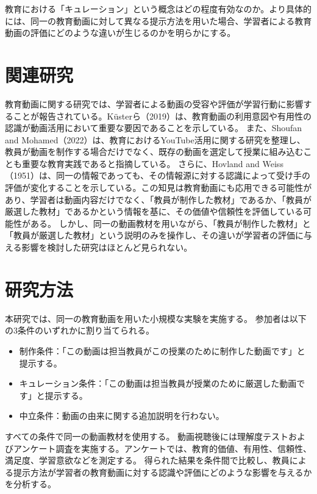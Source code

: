 \documentclass[a4paper,10pt]{ltjsarticle}
\begin{document}
教育における「キュレーション」という概念はどの程度有効なのか。より具体的には、同一の教育動画に対して異なる提示方法を用いた場合、学習者による教育動画の評価にどのような違いが生じるのかを明らかにする。

\section{関連研究}

教育動画に関する研究では、学習者による動画の受容や評価が学習行動に影響することが報告されている。Küsterら（2019）は、教育動画の利用意図や有用性の認識が動画活用において重要な要因であることを示している。
また、Shoufan and Mohamed（2022）は、教育におけるYouTube活用に関する研究を整理し、教員が動画を制作する場合だけでなく、既存の動画を選定して授業に組み込むことも重要な教育実践であると指摘している。
さらに、Hovland and Weiss（1951）は、同一の情報であっても、その情報源に対する認識によって受け手の評価が変化することを示している。この知見は教育動画にも応用できる可能性があり、学習者は動画内容だけでなく、「教員が制作した教材」であるか、「教員が厳選した教材」であるかという情報を基に、その価値や信頼性を評価している可能性がある。
しかし、同一の動画教材を用いながら、「教員が制作した教材」と「教員が厳選した教材」という説明のみを操作し、その違いが学習者の評価に与える影響を検討した研究はほとんど見られない。

\section{研究方法}

本研究では、同一の教育動画を用いた小規模な実験を実施する。
参加者は以下の3条件のいずれかに割り当てられる。

\begin{itemize}
  \item 制作条件：「この動画は担当教員がこの授業のために制作した動画です」と提示する。
  \item キュレーション条件：「この動画は担当教員が授業のために厳選した動画です」と提示する。
  \item 中立条件：動画の由来に関する追加説明を行わない。
\end{itemize}

すべての条件で同一の動画教材を使用する。
動画視聴後には理解度テストおよびアンケート調査を実施する。アンケートでは、教育的価値、有用性、信頼性、満足度、学習意欲などを測定する。
得られた結果を条件間で比較し、教員による提示方法が学習者の教育動画に対する認識や評価にどのような影響を与えるかを分析する。
\end{document}
